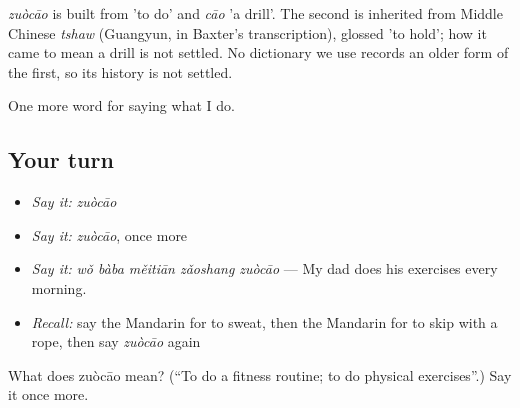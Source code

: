 \begin{cousinweb}
\emph{zuòcāo} is built from  'to do' and \emph{cāo} 'a drill'. The second is inherited from Middle Chinese \emph{tshaw} (Guangyun, in Baxter's transcription), glossed 'to hold'; how it came to mean a drill is not settled. No dictionary we use records an older form of the first, so its history is not settled.
\end{cousinweb}

\begin{grammarlens}[title={What you've built}]
One more word for saying what I do.
\end{grammarlens}

\subsection*{Your turn}
\begin{itemize}
\raggedright
  \item \emph{Say it:} \emph{zuòcāo}
  \item \emph{Say it:} \emph{zuòcāo}, once more
  \item \emph{Say it:} \emph{wǒ bàba měitiān zǎoshang zuòcāo} — My dad does his exercises every morning.
  \item \emph{Recall:} say the Mandarin for to sweat, then the Mandarin for to skip with a rope, then say \emph{zuòcāo} again
\end{itemize}

\begin{tcolorbox}[breakable,colback=teal!4,colframe=teal!35!black,title={Before you move on}]
What does zuòcāo mean? (\textquotedblleft{}To do a fitness routine; to do physical exercises\textquotedblright{}.) Say it once more.
\end{tcolorbox}
